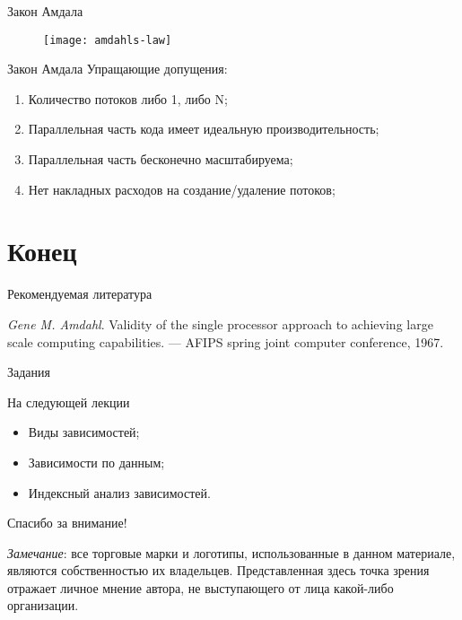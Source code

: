 \begin{frame}{Закон Амдала}
\begin{figure}
    \centering
    \texttt{[image: amdahls-law]}
\end{figure}
\end{frame}

\begin{frame}{Закон Амдала}
Упращающие допущения:
\begin{enumerate}
    \item Количество потоков либо 1, либо N;
    \item Параллельная часть кода имеет идеальную производительность;
    \item Параллельная часть бесконечно масштабируема;
    \item Нет накладных расходов на создание/удаление потоков;
\end{enumerate}
\end{frame}

\section*{Конец}

\begin{frame}[allowframebreaks]{Рекомендуемая литература}
\begin{thebibliography}{99}
    \bibitem{} \textit{Gene M. Amdahl}. Validity of the single processor
    approach to achieving large scale computing capabilities. --- AFIPS spring
    joint computer conference, 1967.
\end{thebibliography}
\end{frame}

\begin{frame}{Задания}
\end{frame}

\begin{frame}{На следующей лекции}
\begin{itemize}
    \item Виды зависимостей;
    \item Зависимости по данным;
    \item Индексный анализ зависимостей.
\end{itemize}
\end{frame}

\begin{frame}

{\huge{Спасибо за внимание!}\par}

\vfill

\tiny{\textit{Замечание}: все торговые марки и логотипы, использованные в данном материале, являются собственностью их владельцев. Представленная здесь точка зрения отражает личное мнение автора, не выступающего от лица какой-либо организации.}

\end{frame}


